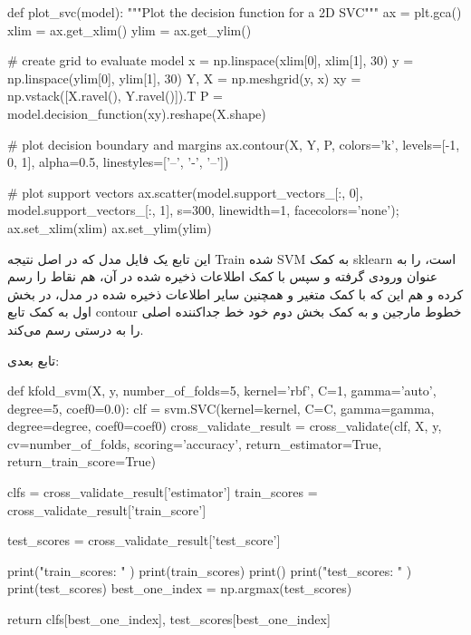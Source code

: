 \documentclass[12pt,titlepage,a4page , tikz , multi,table , svgnames,xcdraw]{article}
\begin{document}
\begin{latin}
\begin{python}[language=Python]
def plot_svc(model):
    """Plot the decision function for a 2D SVC"""
    ax = plt.gca()
    xlim = ax.get_xlim()
    ylim = ax.get_ylim()

    # create grid to evaluate model
    x = np.linspace(xlim[0], xlim[1], 30)
    y = np.linspace(ylim[0], ylim[1], 30)
    Y, X = np.meshgrid(y, x)
    xy = np.vstack([X.ravel(), Y.ravel()]).T
    P = model.decision_function(xy).reshape(X.shape)

    # plot decision boundary and margins
    ax.contour(X, Y, P, colors='k',
               levels=[-1, 0, 1], alpha=0.5,
               linestyles=['--', '-', '--'])

    # plot support vectors
    ax.scatter(model.support_vectors_[:, 0],
               model.support_vectors_[:, 1],
               s=300, linewidth=1, facecolors='none');
    ax.set_xlim(xlim)
    ax.set_ylim(ylim)
\end{python}

\end{latin}

این تابع یک فایل مدل که در اصل نتیجه Train شده SVM به کمک sklearn است، را به عنوان ورودی گرفته و سپس با کمک اطلاعات ذخیره شده در آن، هم نقاط را رسم کرده و هم این که با کمک متغیر  و همچنین سایر اطلاعات ذخیره شده در مدل، در بخش اول به کمک تابع contour خطوط مارجین و به کمک بخش دوم خود خط جداکننده اصلی را به درستی رسم می‌کند.

تابع بعدی:


\begin{latin}
\begin{python}[language=Python]
def kfold_svm(X, y, number_of_folds=5, kernel='rbf', C=1,
 gamma='auto', degree=5, coef0=0.0):
    clf = svm.SVC(kernel=kernel, C=C, gamma=gamma,
     degree=degree, coef0=coef0)
    cross_validate_result = cross_validate(clf, X, y, 
    cv=number_of_folds, scoring='accuracy',
     return_estimator=True, return_train_score=True)
     
    clfs = cross_validate_result['estimator']
    train_scores = cross_validate_result['train_score']

	test_scores = cross_validate_result['test_score']

    print("train_scores: " )
    print(train_scores)
    print()
    print("test_scores: " )
    print(test_scores)
    best_one_index = np.argmax(test_scores)

    return clfs[best_one_index], test_scores[best_one_index]
\end{python}

\end{latin}
\end{document}
